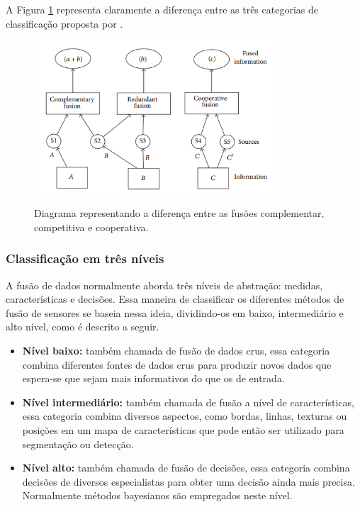 \documentclass[acronym, symbols]{fei}
\begin{document}
				A Figura \ref{fig:classificacao_fusao_de_sensores} representa claramente a diferença entre as três categorias de classificação proposta por \textcite{durrant1988sensor}.
			
				\begin{figure}[!htb]
					\centering
					\caption{Diagrama representando a diferença entre as fusões complementar, competitiva e cooperativa.} 
					\includegraphics[width=0.8\textwidth]{classificacao_fusao_de_sensores.png}
					\label{fig:classificacao_fusao_de_sensores}
				\end{figure}
			
			\subsubsection{Classificação em três níveis}
			
				A fusão de dados normalmente aborda três níveis de abstração: medidas, características e decisões. Essa maneira de classificar os diferentes métodos de fusão de sensores se baseia nessa ideia, dividindo-os em baixo, intermediário e alto nível, como é descrito a seguir.
			
				\begin{itemize}
					\item \textbf{Nível baixo:} também chamada de fusão de dados crus, essa categoria combina diferentes fontes de dados crus para produzir novos dados que espera-se que sejam mais informativos do que os de entrada.
					
					\item \textbf{Nível intermediário:} também chamada de fusão a nível de características, essa categoria combina diversos aspectos, como bordas, linhas, texturas ou posições em um mapa de características que pode então ser utilizado para segmentação ou detecção.
					
					\item \textbf{Nível alto:} também chamada de fusão de decisões, essa categoria combina decisões de diversos especialistas para obter uma decisão ainda mais precisa. Normalmente métodos bayesianos são empregados neste nível.
				\end{itemize}
			
\end{document}
